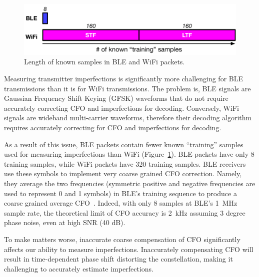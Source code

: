\begin{figure}
    \centering
    \includegraphics[width=\linewidth]{bletracking/plots/knownsamples}
    \caption{
      Length of known samples in BLE and WiFi packets.
    \label{fig:training_length}
  }
\end{figure}

Measuring transmitter imperfections is significantly more challenging for BLE
transmissions than it is for WiFi transmissions.
%
The problem is, BLE signals are Gaussian Frequency Shift Keying
(GFSK) waveforms that do not require accurately correcting CFO and \iq imperfections
for decoding. 
%
Conversely, WiFi signals are wideband multi-carrier waveforms, therefore their
decoding algorithm requires accurately correcting for CFO and \iq imperfections for decoding.

As a result of this issue, BLE packets contain fewer
known ``training'' samples used for measuring imperfections than WiFi
(Figure~\ref{fig:training_length}). BLE packets have only 8 training samples,
while WiFi packets have 320 training samples.
%
BLE receivers use these symbols to implement very coarse grained CFO correction.
%
Namely, they average the two frequencies (symmetric positive and negative
frequencies are used to represent 0 and 1 symbols) in BLE's training
sequence to produce a coarse grained average CFO~\cite{cvtracksun}.
%
%
%
Indeed, with only 8 samples at BLE's 1~MHz sample rate, the theoretical limit of CFO accuracy is 2~kHz
assuming 3 degree phase noise, even at high SNR (40 dB). 

To make matters worse, inaccurate coarse compensation of CFO significantly affects our ability to measure \iq imperfections. Inaccurately compensating CFO will result in time-dependent phase shift distorting the \iq constellation, making it challenging to accurately estimate \iq imperfections.


